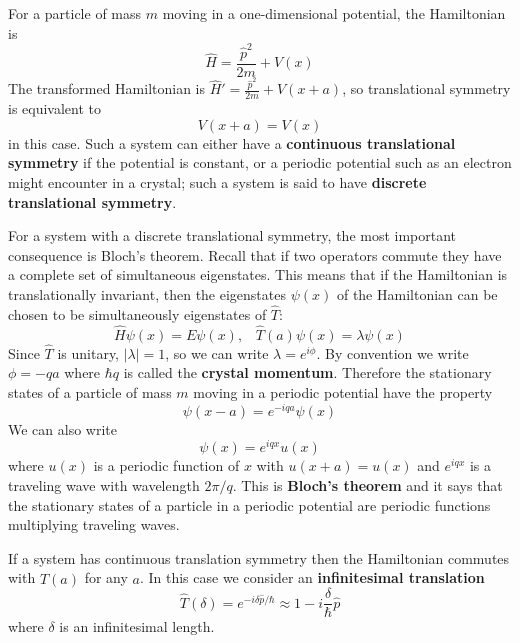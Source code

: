 \documentclass[12pt, a4paper, oneside, openright, titlepage]{book}
\begin{document}
For a particle of mass $m$ moving in a one-dimensional potential, the Hamiltonian is \begin{equation*}
    \hat{H} = \frac{\hat{p}^2}{2m} + V(x)
\end{equation*}
The transformed Hamiltonian is $\hat{H}' = \frac{\hat{p}^2}{2m} + V(x+a)$, so translational symmetry is equivalent to \begin{equation*}
    V(x+a) = V(x)
\end{equation*}
in this case. Such a system can either have a \textbf{continuous translational symmetry} if the potential is constant, or a periodic potential such as an electron might encounter in a crystal; such a system is said to have \textbf{discrete translational symmetry}.

For a system with a discrete translational symmetry, the most important consequence is Bloch's theorem. Recall that if two operators commute they have a complete set of simultaneous eigenstates. This means that if the Hamiltonian is translationally invariant, then the eigenstates $\psi(x)$ of the Hamiltonian can be chosen to be simultaneously eigenstates of $\hat{T}$: \begin{equation*}
    \hat{H}\psi(x) = E\psi(x),\;\;\;\hat{T}(a)\psi(x) = \lambda\psi(x)
\end{equation*}
Since $\hat{T}$ is unitary, $|\lambda| = 1$, so we can write $\lambda = e^{i\phi}$. By convention we write $\phi = -qa$ where $\hbar q$ is called the \textbf{crystal momentum}. Therefore the stationary states of a particle of mass $m$ moving in a periodic potential have the property \begin{equation*}
    \psi(x-a) = e^{-iqa}\psi(x)
\end{equation*}
We can also write \begin{equation*}
    \psi(x) = e^{iqx}u(x)
\end{equation*}
where $u(x)$ is a periodic function of $x$ with $u(x+a) = u(x)$ and $e^{iqx}$ is a traveling wave with wavelength $2\pi/q$. This is \textbf{Bloch's theorem} and it says that the stationary states of a particle in a periodic potential are periodic functions multiplying traveling waves.


If a system has continuous translation symmetry then the Hamiltonian commutes with $\hat{T}(a)$ for any $a$. In this case we consider an \textbf{infinitesimal translation} \begin{equation*}
    \hat{T}(\delta) = e^{-i\delta \hat{p}/\hbar}\approx 1-i\frac{\delta}{\hbar}\hat{p}
\end{equation*}
where $\delta$ is an infinitesimal length.
\end{document}
